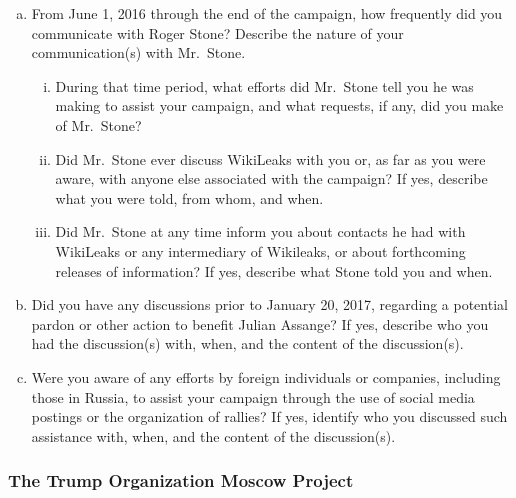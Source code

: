 \begin{enumerate}[a.]
\item From June 1, 2016 through the end of the campaign, how frequently did you communicate with Roger Stone? Describe the nature of your communication(s) with Mr.~Stone.

\begin{enumerate}[i.]

\item During that time period, what efforts did Mr.~Stone tell you he was making to assist your campaign, and what requests, if any, did you make of Mr.~Stone?

\item Did Mr.~Stone ever discuss WikiLeaks with you or, as far as you were aware, with anyone else associated with the campaign?
If yes, describe what you were told, from whom, and when.

\item Did Mr.~Stone at any time inform you about contacts he had with WikiLeaks or any intermediary of Wikileaks, or about forthcoming releases of information?
If yes, describe what Stone told you and when.

\end{enumerate}

\item Did you have any discussions prior to January 20, 2017, regarding a potential pardon or other action to benefit Julian Assange?
If yes, describe who you had the discussion(s) with, when, and the content of the discussion(s).

\item Were you aware of any efforts by foreign individuals or companies, including those in Russia, to assist your campaign through the use of social media postings or the organization of rallies?
If yes, identify who you discussed such assistance with, when, and the content of the discussion(s).

\end{enumerate}

\subsubsection{The Trump Organization Moscow Project}

